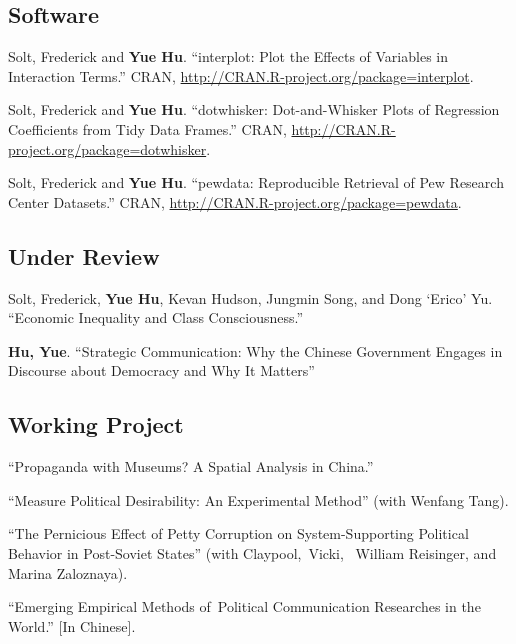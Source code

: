 \documentclass[a4paper,10pt]{article} %
\renewenvironment{itemize}{
	\begin{list}{}{
			\setlength{\leftmargin}{1.5em}
		}
	}{
\end{list}
}
\begin{document}
	\subsection*{Software}
		\begin{itemize}
			\item Solt, Frederick and \textbf{Yue Hu}. ``interplot: Plot the Effects of Variables in Interaction Terms.'' CRAN, \url{http://CRAN.R-project.org/package=interplot}.
			\item Solt, Frederick and \textbf{Yue Hu}. ``dotwhisker: Dot-and-Whisker Plots of Regression Coefficients from Tidy Data Frames.'' CRAN, \url{http://CRAN.R-project.org/package=dotwhisker}.
			\item Solt, Frederick and \textbf{Yue Hu}. ``pewdata: Reproducible Retrieval of Pew Research Center Datasets.'' CRAN, \url{http://CRAN.R-project.org/package=pewdata}.
		\end{itemize}
	
	\subsection*{Under Review}
		\begin{itemize}
			\item Solt, Frederick, \textbf{Yue Hu}, Kevan Hudson, Jungmin Song, and Dong `Erico' Yu. ``Economic Inequality and Class Consciousness.'' 
			\item \textbf{Hu, Yue}. ``Strategic Communication: Why the Chinese Government Engages in Discourse about Democracy and Why It Matters'' 
		\end{itemize}
		
	\subsection*{Working Project}
		\begin{itemize}
			\item ``Propaganda with Museums? A Spatial Analysis in China.''
			\item ``Measure Political Desirability: An Experimental Method'' (with Wenfang Tang).
			\item ``The Pernicious Effect of Petty Corruption on System-Supporting Political Behavior in Post-Soviet States'' (with Claypool, Vicki,  William Reisinger, and Marina Zaloznaya).
			\item ``Emerging Empirical Methods of Political Communication Researches in the World.'' [In Chinese].
		\end{itemize}
		
\end{document}
